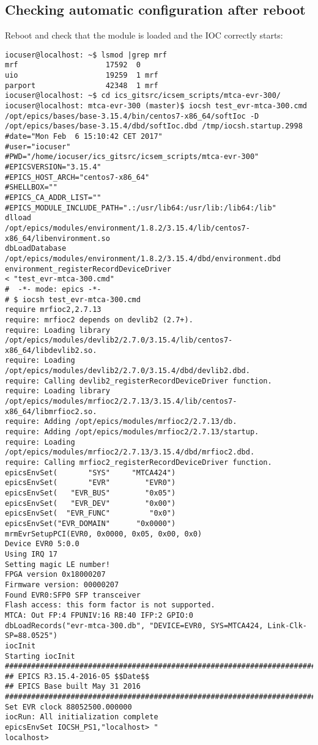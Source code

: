 \documentclass[11pt
  , a4paper
  , article
  , oneside
  , showtrims
]{memoir}
\begin{document}
\subsection{Checking automatic configuration after reboot}
Reboot and check that the module is loaded and the IOC correctly starts:
\begin{lstlisting}[style=termstyle]
iocuser@localhost: ~$ lsmod |grep mrf
mrf                    17592  0 
uio                    19259  1 mrf
parport                42348  1 mrf
iocuser@localhost: ~$ cd ics_gitsrc/icsem_scripts/mtca-evr-300/
iocuser@localhost: mtca-evr-300 (master)$ iocsh test_evr-mtca-300.cmd
/opt/epics/bases/base-3.15.4/bin/centos7-x86_64/softIoc -D /opt/epics/bases/base-3.15.4/dbd/softIoc.dbd /tmp/iocsh.startup.2998
#date="Mon Feb  6 15:10:42 CET 2017"
#user="iocuser"
#PWD="/home/iocuser/ics_gitsrc/icsem_scripts/mtca-evr-300"
#EPICSVERSION="3.15.4"
#EPICS_HOST_ARCH="centos7-x86_64"
#SHELLBOX=""
#EPICS_CA_ADDR_LIST=""
#EPICS_MODULE_INCLUDE_PATH=".:/usr/lib64:/usr/lib:/lib64:/lib"
dlload         /opt/epics/modules/environment/1.8.2/3.15.4/lib/centos7-x86_64/libenvironment.so
dbLoadDatabase /opt/epics/modules/environment/1.8.2/3.15.4/dbd/environment.dbd
environment_registerRecordDeviceDriver
< "test_evr-mtca-300.cmd"
#  -*- mode: epics -*-
# $ iocsh test_evr-mtca-300.cmd
require mrfioc2,2.7.13
require: mrfioc2 depends on devlib2 (2.7+).
require: Loading library /opt/epics/modules/devlib2/2.7.0/3.15.4/lib/centos7-x86_64/libdevlib2.so.
require: Loading /opt/epics/modules/devlib2/2.7.0/3.15.4/dbd/devlib2.dbd.
require: Calling devlib2_registerRecordDeviceDriver function.
require: Loading library /opt/epics/modules/mrfioc2/2.7.13/3.15.4/lib/centos7-x86_64/libmrfioc2.so.
require: Adding /opt/epics/modules/mrfioc2/2.7.13/db.
require: Adding /opt/epics/modules/mrfioc2/2.7.13/startup.
require: Loading /opt/epics/modules/mrfioc2/2.7.13/3.15.4/dbd/mrfioc2.dbd.
require: Calling mrfioc2_registerRecordDeviceDriver function.
epicsEnvSet(       "SYS"     "MTCA424")
epicsEnvSet(       "EVR"        "EVR0")
epicsEnvSet(   "EVR_BUS"        "0x05")
epicsEnvSet(   "EVR_DEV"        "0x00")
epicsEnvSet(  "EVR_FUNC"         "0x0")
epicsEnvSet("EVR_DOMAIN"      "0x0000")
mrmEvrSetupPCI(EVR0, 0x0000, 0x05, 0x00, 0x0)
Device EVR0 5:0.0
Using IRQ 17
Setting magic LE number!
FPGA version 0x18000207
Firmware version: 00000207
Found EVR0:SFP0 SFP transceiver
Flash access: this form factor is not supported.
MTCA: Out FP:4 FPUNIV:16 RB:40 IFP:2 GPIO:0
dbLoadRecords("evr-mtca-300.db", "DEVICE=EVR0, SYS=MTCA424, Link-Clk-SP=88.0525")
iocInit
Starting iocInit
############################################################################
## EPICS R3.15.4-2016-05 $$Date$$
## EPICS Base built May 31 2016
############################################################################
Set EVR clock 88052500.000000
iocRun: All initialization complete
epicsEnvSet IOCSH_PS1,"localhost> "
localhost> 
\end{lstlisting}

\clearpage

\backmatter
%
%
%

%
%

\end{document}
